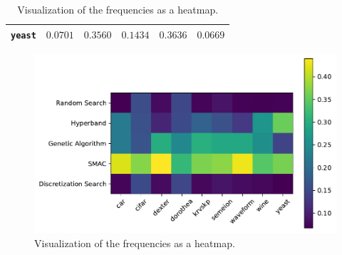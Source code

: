 \begin{table}[ht]
\begin{subtable}{\textwidth}
\begin{tabular}{l|ccccc}
            \texttt{yeast} & $0.0701$ & $0.3560$ & $0.1434$ & $\boldsymbol{0.3636}$ & $0.0669$ \\
            \hline
        \end{tabular}
    \end{subtable}
    \par\bigskip
    \begin{subfigure}{\textwidth}
        \centering
        \caption{Visualization of the frequencies as a heatmap.}
        \includegraphics[width=\textwidth,keepaspectratio]{gfx/Figures/Evaluation/OptimizerCallsHeatmap.pdf}
    \end{subfigure}
\end{table}

